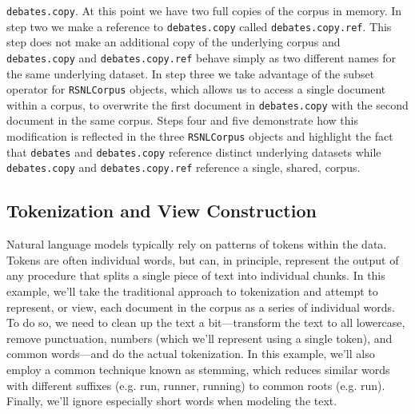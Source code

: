 \documentclass[11pt]{article}
\let\code=\texttt
\let\rclass=\texttt
\begin{document}
\code{debates.copy}.  At this point we have two full copies of the
corpus in memory.  In step two we make a reference to
\code{debates.copy} called \code{debates.copy.ref}.  This step does
not make an additional copy of the underlying corpus and
\code{debates.copy} and \code{debates.copy.ref} behave simply as two
different names for the same underlying dataset.  In step three we
take advantage of the subset operator for \rclass{RSNLCorpus} objects,
which allows us to access a single document within a corpus, to
overwrite the first document in \code{debates.copy} with the second
document in the same corpus.  Steps four and five demonstrate how this
modification is reflected in the three \rclass{RSNLCorpus} objects and
highlight the fact that \code{debates} and \code{debates.copy}
reference distinct underlying datasets while \code{debates.copy} and
\code{debates.copy.ref} reference a single, shared, corpus.

\subsection{Tokenization and View Construction}\label{sec:tokenview}

Natural language models typically rely on patterns of tokens within
the data.  Tokens are often individual words, but can, in principle,
represent the output of any procedure that splits a single piece of
text into individual chunks.  In this example, we'll take the
traditional approach to tokenization and attempt to represent, or
view, each document in the corpus as a series of individual words.  To
do so, we need to clean up the text a bit---transform the text to all
lowercase, remove punctuation, numbers (which we'll represent using a
single token), and common words---and do the actual tokenization.  In
this example, we'll also employ a common technique known as stemming,
which reduces similar words with different suffixes (e.g. run, runner,
running) to common roots (e.g. run).  Finally, we'll ignore especially
short words when modeling the text.
\end{document}
